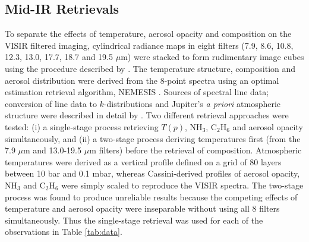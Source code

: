 \documentclass[final,5p,times,twocolumn,authoryear]{elsarticle}
\begin{document}
\subsection{Mid-IR Retrievals}
\label{model}

To separate the effects of temperature, aerosol opacity and composition on the VISIR filtered imaging, cylindrical radiance maps in eight filters (7.9, 8.6, 10.8, 12.3, 13.0, 17.7, 18.7 and 19.5 $\mu$m) were stacked to form rudimentary image cubes using the procedure described by \citet{09fletcher_imaging}.  The temperature structure, composition and aerosol distribution were derived from the 8-point spectra using an optimal estimation retrieval algorithm, NEMESIS \citep{08irwin}.  Sources of spectral line data; conversion of line data to $k$-distributions and Jupiter's \textit{a priori} atmospheric structure were described in detail by \citet{11fletcher_trecs}.  Two different retrieval approaches were tested: (i) a single-stage process retrieving $T(p)$, NH$_3$, C$_2$H$_6$ and aerosol opacity simultaneously, and (ii) a two-stage process deriving temperatures first (from the 7.9 $\mu$m and 13.0-19.5 $\mu$m filters) before the retrieval of composition.  Atmospheric temperatures were derived as a vertical profile defined on a grid of 80 layers between 10 bar and 0.1 mbar, whereas Cassini-derived profiles of aerosol opacity, NH$_3$ and C$_2$H$_6$ \citep{09fletcher_ph3, 07nixon} were simply scaled to reproduce the VISIR spectra.  The two-stage process was found to produce unreliable results because the competing effects of temperature and aerosol opacity were inseparable without using all 8 filters simultaneously.  Thus the single-stage retrieval was used for each of the observations in Table \ref{tab:data}.  

\end{document}
